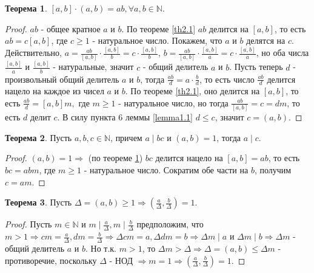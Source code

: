\documentclass[a4paper, 12pt]{article}
\newcommand{\N}{\mathbb{N}}
\renewcommand{\div}{\mid}
\theoremstyle{definition}
\newtheorem{theorem}{Теорема}[section]
\begin{document}
    \begin{theorem} \label{th2.2}
        $[a,b]\cdot (a,b)=ab, \forall a,b \in \mathbb{N}$.
    \end{theorem}
    \begin{proof}
        $ab$ - общее кратное $a$ и $b$. По теореме \ref{th2.1} $ab$ делится на $[a,b]$, то есть $ab=c[a,b]$, где $c\geq 1$ - натуральное число. Покажем, что $a$ и $b$ делятся на $c$. Действительно, $a=\frac{ab}{[a,b]}\cdot \frac{[a,b]}{b}=c\cdot \frac{[a,b]}{b}$, $b=\frac{ab}{[a,b]}\cdot \frac{[a,b]}{a}=c\cdot \frac{[a,b]}{a}$, но оба числа $\frac{[a,b]}{a}$ и $\frac{[a,b]}{b}$ - натуральные, значит $c$ - общий делитель $a$ и $b$. Пусть теперь $d$ - произвольный общий делитель $a$ и $b$, тогда $\frac{ab}{d}=a\cdot \frac{b}{d}$, то есть число $\frac{ab}{d}$ делится нацело на каждое из чисел $a$ и $b$. По теореме \ref{th2.1}, оно делится на $[a,b]$, то есть $\frac{ab}{d}=[a,b]m, $ где $ m\geq 1$ - натуральное число, но тогда $\frac{ab}{[a,b]}=c=dm$, то есть $d$ делит $c$. В силу пункта 6 леммы \ref{lemma1.1} $d\leq c$, значит $c=(a,b)$.
    \end{proof}
    \begin{theorem} \label{th2.3}
        Пусть $a,b,c \in \mathbb{N}$, причем $a \div bc$ и $(a,b)=1$, тогда $a \div c$. 
    \end{theorem}
    \begin{proof}
        $(a,b)=1 \Rightarrow$ (по теореме \ref{th2.2}) $bc$ делится нацело на $[a,b]=ab$, то есть $bc=abm$, где $m\geq 1$ - натуральное число. Сократим обе части на $b$, получим $c=am$. 
    \end{proof}
    \begin{theorem} \label{th2.4}
        Пусть $\Delta=(a,b)\geq 1 \Rightarrow (\frac{a}{\Delta}, \frac{b}{\Delta})=1$.
    \end{theorem} 
    \begin{proof}
        Пусть $m\in \N$ и $m \mid \frac{a}{\Delta}, m \mid \frac{b}{\Delta}$ предположим, что $m > 1 \Rightarrow cm=\frac{a}{\Delta},dm=\frac{b}{\Delta}\Rightarrow \Delta cm=a, \Delta dm=b \Rightarrow \Delta m \mid a$ и $\Delta m\mid b\Rightarrow \Delta m$ - общий делитель $a$ и $b$. Но т.к. $m>1$, то $\Delta m>\Delta \Rightarrow \Delta=(a,b) \leq \Delta m$ - противоречие, поскольку $\Delta$ - НОД $\Rightarrow m=1\Rightarrow (\frac{a}{\Delta}, \frac{b}{\Delta})=1$.
    \end{proof} 
\end{document}
